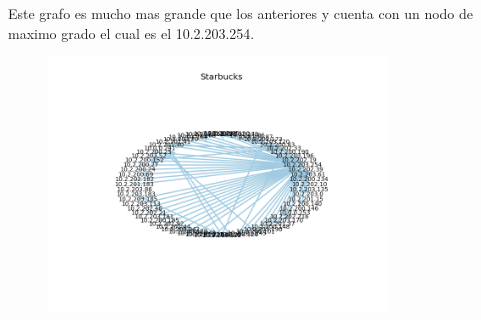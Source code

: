 
Este grafo es mucho mas grande que los anteriores y cuenta con un nodo de maximo grado el cual es el 10.2.203.254.

\begin{figure}[H]
 \centering
	\includegraphics[width=0.8\textwidth]{figs/dc.png}
	\caption{}
	\label{fig:dc-grafo}
\end{figure}